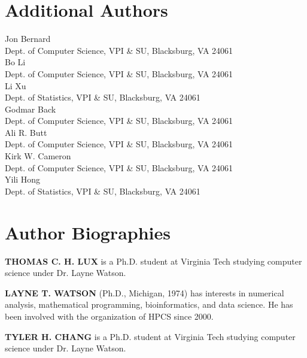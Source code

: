 \documentclass{scspaperproc}
\theoremstyle{scsthe}
\begin{document}




\section*{Additional Authors}
Jon Bernard\\
Dept. of Computer Science, VPI \& SU, Blacksburg, VA 24061 \\ [8pt]
Bo Li \\
Dept. of Computer Science, VPI \& SU, Blacksburg, VA 24061\\ [8pt]
Li Xu \\
Dept. of Statistics, VPI \& SU, Blacksburg, VA 24061\\ [8pt]
Godmar Back\\
Dept. of Computer Science, VPI \& SU, Blacksburg, VA 24061\\ [8pt]
Ali R. Butt\\
Dept. of Computer Science, VPI \& SU, Blacksburg, VA 24061\\ [8pt]
Kirk W. Cameron\\
Dept. of Computer Science, VPI \& SU, Blacksburg, VA 24061\\ [8pt]
Yili Hong\\
Dept. of Statistics, VPI \& SU, Blacksburg, VA 24061\\ 

\section*{Author Biographies}

\textbf{\uppercase{Thomas C. H. Lux}} is a Ph.D. student at Virginia Tech
studying computer science under Dr. Layne Watson.

\textbf{\uppercase{Layne T. Watson}} (Ph.D., Michigan, 1974) has interests
in numerical analysis, mathematical programming, bioinformatics, and data
science.
He has been involved with the organization of HPCS since 2000.

\textbf{\uppercase{Tyler H. Chang}} is a Ph.D. student at Virginia Tech
studying computer science under Dr. Layne Watson.
\end{document}
